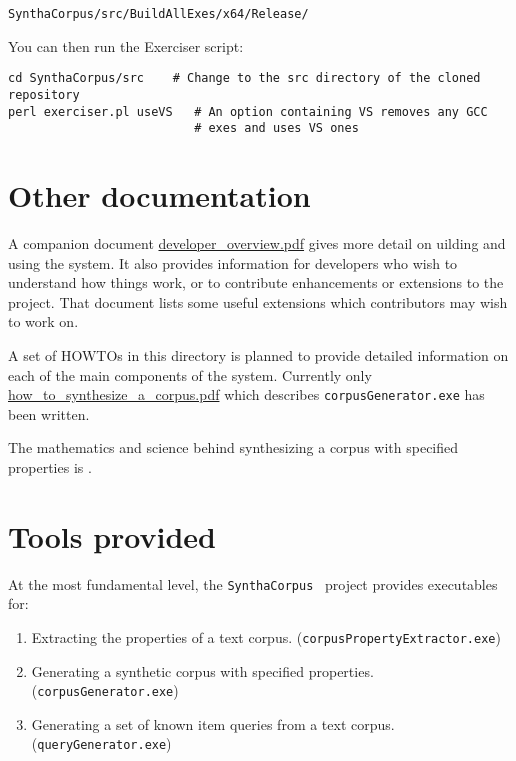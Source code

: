 \documentclass{article}
\newcommand{\red}[1]{{\color{red}{\emph{#1}}}}
\newcommand{\projectName}{\texttt{SynthaCorpus}}
\begin{document}
\begin{verbatim}
SynthaCorpus/src/BuildAllExes/x64/Release/
\end{verbatim}

You can then run the Exerciser script:
\begin{verbatim}
cd SynthaCorpus/src    # Change to the src directory of the cloned repository
perl exerciser.pl useVS   # An option containing VS removes any GCC
                          # exes and uses VS ones
\end{verbatim}



\section{Other documentation}
A companion document \url{developer_overview.pdf} gives more detail on 
uilding and using the system.  It also provides
information for developers who wish to understand how things work, or
to contribute enhancements or extensions to the project.  That
document lists some useful extensions which contributors may wish to
work on.

A set of HOWTOs in this directory is planned to  provide detailed
information on each of the main components of the system.  Currently
only \url{how_to_synthesize_a_corpus.pdf} which describes
\verb|corpusGenerator.exe| has been written.

The mathematics and science behind synthesizing a corpus with
specified properties is \red{described
  elsewhere}.


\section{Tools provided}

At the most fundamental level, the \projectName~ project provides executables for:
\begin{enumerate}
\item Extracting the properties of a text corpus. (\texttt{corpusPropertyExtractor.exe})
\item Generating a synthetic corpus with specified properties. (\texttt{corpusGenerator.exe})
\item Generating a set of known item queries from a text corpus. (\texttt{queryGenerator.exe})
\end{enumerate}
\end{document}
